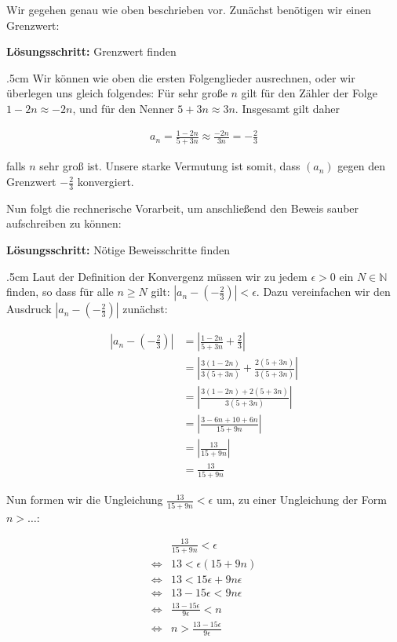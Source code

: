 \documentclass[fontsize=9pt,
               parskip=half-,
               DIV=14,
               listof=chapterentry,
               tocflat]{scrbook}
\newenvironment{indentblock}{\begin{adjustwidth}{.5cm}{}}{\end{adjustwidth}}
\newcommand{\proofstep}[1]{\textbf{\textcolor{sblau}{#1}}}
\begin{document}
\begin{solutionprocess*}
Wir gegehen genau wie oben beschrieben vor. Zunächst benötigen wir einen Grenzwert:

\proofstep{Lösungsschritt:}
 Grenzwert finden\begin{indentblock}
Wir können wie oben die ersten Folgenglieder ausrechnen, oder wir überlegen uns gleich folgendes: Für sehr große $n$ gilt für den Zähler der Folge $1-2n\approx -2n$, und für den Nenner $5+3n\approx 3n$. Insgesamt gilt daher

\begin{align*}
a_{n}={\frac {1-2n}{5+3n}}\approx {\frac {-2n}{3n}}=-{\frac {2}{3}}
\end{align*}

falls $n$ sehr groß ist. Unsere starke Vermutung ist somit, dass $(a_{n})$ gegen den Grenzwert $-{\tfrac {2}{3}}$ konvergiert.

\end{indentblock}

Nun folgt die rechnerische Vorarbeit, um anschließend den Beweis sauber aufschreiben zu können:

\proofstep{Lösungsschritt:}
 Nötige Beweisschritte finden\begin{indentblock}
Laut der Definition der Konvergenz müssen wir zu jedem $\epsilon >0$ ein $N\in \mathbb {N} $ finden, so dass für alle $n\geq N$ gilt: $|a_{n}-(-{\tfrac {2}{3}})|<\epsilon $. Dazu vereinfachen wir den Ausdruck $|a_{n}-(-{\tfrac {2}{3}})|$ zunächst:

\begin{align*}
|a_{n}-(-{\tfrac {2}{3}})|&=\left|{\frac {1-2n}{5+3n}}+{\frac {2}{3}}\right|\\[0.3em]&=\left|{\frac {3(1-2n)}{3(5+3n)}}+{\frac {2(5+3n)}{3(5+3n)}}\right|\\[0.3em]&=\left|{\frac {3(1-2n)+2(5+3n)}{3(5+3n)}}\right|\\[0.3em]&=\left|{\frac {3-6n+10+6n}{15+9n}}\right|\\[0.3em]&=\left|{\frac {13}{15+9n}}\right|\\[0.3em]&={\frac {13}{15+9n}}
\end{align*}

Nun formen wir die Ungleichung ${\tfrac {13}{15+9n}}<\epsilon $ um, zu einer Ungleichung der Form $n>\ldots $:

\begin{align*}
&{\frac {13}{15+9n}}<\epsilon \\[0.3em]\iff &13<\epsilon (15+9n)\\[0.3em]\iff &13<15\epsilon +9n\epsilon \\[0.3em]\iff &13-15\epsilon <9n\epsilon \\[0.3em]\iff &{\frac {13-15\epsilon }{9\epsilon }}<n\\[0.3em]\iff &n>{\frac {13-15\epsilon }{9\epsilon }}
\end{align*}


\end{indentblock}
\end{solutionprocess*}
\end{document}
